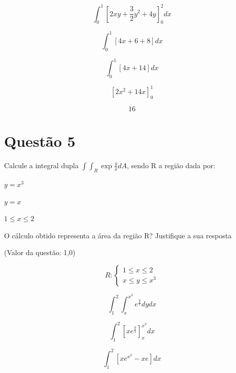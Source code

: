 \documentclass[10pt,a4paper]{article}
\begin{document}
	\begin{equation*}
		\int_{0}^{1} \left[2xy + \frac{3}{2}y^2 + 4y\right]_{0}^{2} dx
	\end{equation*}
	
	\begin{equation*}
		\int_{0}^{1} \left[4x + 6 + 8\right] dx
	\end{equation*}
	
	\begin{equation*}
		\int_{0}^{1} \left[4x + 14\right] dx
	\end{equation*}
	
	\begin{equation*}
		\left[2x^2 + 14x\right]_{0}^{1}
	\end{equation*}
	
	\begin{equation}
		16
	\end{equation}
	
	\section*{Questão 5}
	
	Calcule a integral dupla $ \int \int_R \exp{\frac{y}{x}} dA $, sendo R a região dada por:
	
	$ y = x^3 $
	
	$ y = x $
	
	$ 1 \le x \le 2 $
	
	O cálculo obtido representa a área da região R? Justifique a sua resposta
	
	(Valor da questão: 1,0)
	
	\begin{equation*}
		R: 
		\begin{cases}
			1 \le x \le 2\\
			x \le y \le x^3
		\end{cases}
	\end{equation*}
	
	\begin{equation*}
		\int_{1}^{2} \int_{x}^{x^3} e^{\frac{y}{x}} dy dx
	\end{equation*}
	
	\begin{equation*}
		\int_{1}^{2} \left[ x e^{\frac{y}{x}} \right]_{x}^{x^3} dx
	\end{equation*}
	
	\begin{equation*}
		\int_{1}^{2} \left[ x e^{x^2} - x e \right] dx
	\end{equation*}
	
\end{document}

